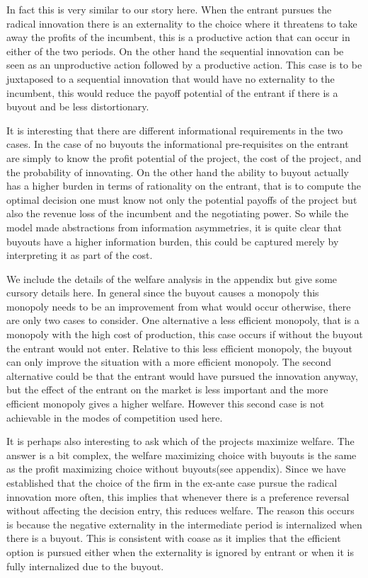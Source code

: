 In fact this is very similar to our story here. When the entrant pursues the radical innovation there is an externality to the choice where it threatens to take away the profits of the incumbent, this is a productive action that can occur in either of the two periods. On the other hand the sequential innovation can be seen as an unproductive action followed by a productive action. This case is to be juxtaposed to a sequential innovation that would have no externality to the incumbent, this would reduce the payoff potential of the entrant if there is a buyout and be less distortionary. 

It is interesting that there are different informational requirements in the two cases. In the case of no buyouts the informational pre-requisites on the entrant are simply to know the profit potential of the project, the cost of the project, and the probability of innovating. On the other hand the ability to buyout actually has a higher burden in terms of rationality on the entrant, that is to compute the optimal decision one must know not only the potential payoffs of the project but also the revenue loss of the incumbent and the negotiating power. So while the model made abstractions from information asymmetries, it is quite clear that buyouts have a higher information burden, this could be captured merely by interpreting it as part of the cost. 

We include the details of the welfare analysis in the appendix but give some cursory details here. In general since the buyout causes a monopoly this monopoly needs to be an improvement from what would occur otherwise, there are only two cases to consider. One alternative a less efficient monopoly, that is a monopoly with the high cost of production, this case occurs if without the buyout the entrant would not enter. Relative to this less efficient monopoly, the buyout can only improve the situation with a more efficient monopoly. The second alternative could be that the entrant would have pursued the innovation anyway, but the effect of the entrant on the market is less important and the more efficient monopoly gives a higher welfare. However this second case is not achievable in the modes of competition used here.

It is perhaps also interesting to ask which of the projects maximize welfare. The answer is a bit complex, the welfare maximizing choice with buyouts is the same as the profit maximizing choice without buyouts(see appendix). Since we have established that the choice of the firm in the ex-ante case pursue the radical innovation more often, this implies that whenever there is a preference reversal without affecting the decision entry, this reduces welfare. The reason this occurs is because the negative externality in the intermediate period is internalized when there is a buyout. This is consistent with coase as it implies that the efficient option is pursued either when the externality is ignored by entrant or when it is fully internalized due to the buyout.

